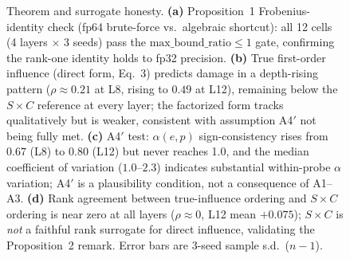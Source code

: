 \begin{figure}[t]
\centering

\caption{Theorem and surrogate honesty.
\textbf{(a)} Proposition~1 Frobenius-identity check (fp64 brute-force vs.\
algebraic shortcut): all 12 cells (4 layers $\times$ 3 seeds) pass the
$\text{max\_bound\_ratio} \leq 1$ gate, confirming the rank-one identity holds
to fp32 precision.
\textbf{(b)} True first-order influence (direct form, Eq.~3) predicts damage
in a depth-rising pattern ($\rho\approx0.21$ at L8, rising to $0.49$ at L12),
remaining below the $S{\times}C$ reference at every layer; the factorized
form tracks qualitatively but is weaker, consistent with assumption A4$'$
not being fully met.
\textbf{(c)} A4$'$ test: $\alpha(e,p)$ sign-consistency rises from $0.67$
(L8) to $0.80$ (L12) but never reaches 1.0, and the median coefficient of
variation ($1.0$--$2.3$) indicates substantial within-probe $\alpha$
variation; A4$'$ is a plausibility condition, not a consequence of A1--A3.
\textbf{(d)} Rank agreement between true-influence ordering and $S{\times}C$
ordering is near zero at all layers ($\rho\approx0$, L12 mean
$+0.075$); $S{\times}C$ is \emph{not} a faithful rank surrogate for direct
influence, validating the Proposition~2 remark.
Error bars are 3-seed sample s.d.\ ($n{-}1$).}
\label{fig:theorem_honesty}
\end{figure}
